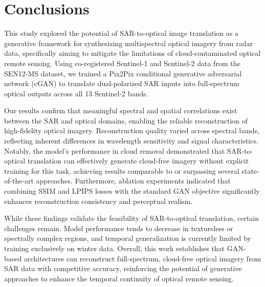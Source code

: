 \section{Conclusions}

This study explored the potential of SAR-to-optical image translation as a generative framework for synthesizing multispectral optical imagery from radar data, specifically aiming to mitigate the limitations of cloud-contaminated optical remote sensing. Using co-registered Sentinel-1 and Sentinel-2 data from the SEN12-MS dataset, we trained a Pix2Pix conditional generative adversarial network (cGAN) to translate dual-polarized SAR inputs into full-spectrum optical outputs across all 13 Sentinel-2 bands.

Our results confirm that meaningful spectral and spatial correlations exist between the SAR and optical domains, enabling the reliable reconstruction of high-fidelity optical imagery. Reconstruction quality varied across spectral bands, reflecting inherent differences in wavelength sensitivity and signal characteristics. Notably, the model's performance in cloud removal demonstrated that SAR-to-optical translation can effectively generate cloud-free imagery without explicit training for this task, achieving results comparable to or surpassing several state-of-the-art approaches. Furthermore, ablation experiments indicated that combining SSIM and LPIPS losses with the standard GAN objective significantly enhances reconstruction consistency and perceptual realism.

While these findings validate the feasibility of SAR-to-optical translation, certain challenges remain. Model performance tends to decrease in textureless or spectrally complex regions, and temporal generalization is currently limited by training exclusively on winter data. Overall, this work establishes that GAN-based architectures can reconstruct full-spectrum, cloud-free optical imagery from SAR data with competitive accuracy, reinforcing the potential of generative approaches to enhance the temporal continuity of optical remote sensing.




